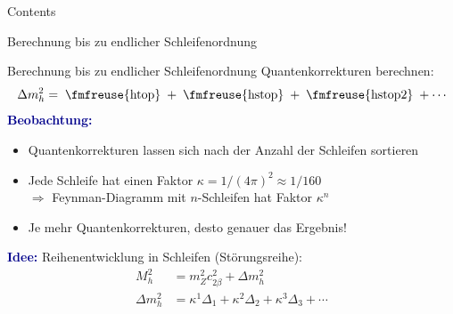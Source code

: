 \documentclass[hyperref={pdfpagelabels=false},ngerman]{beamer}
\newcommand{\fmfvcenter}[1]{\;\vcenter{\hbox{\fmfreuse{#1}}}\;}
\newcommand{\MS}{\ensuremath{M_S}}
\renewcommand{\emph}[1]{\textbf{\textcolor{darkblue}{#1}}}
\newcommand{\MSSM}{\ensuremath{\text{MSSM}}}
\begin{document}
\begin{frame}{Contents}
\end{frame}

\begin{frame}{Berechnung bis zu endlicher Schleifenordnung}
  \begin{center}
  \end{center}
\end{frame}

\begin{frame}{Berechnung bis zu endlicher Schleifenordnung}
  Quantenkorrekturen berechnen:
  \begin{align*}
    \Delta m_h^2 = \fmfvcenter{htop} + \fmfvcenter{hstop} + \fmfvcenter{hstop2} + \cdots
  \end{align*}
  \emph{Beobachtung:}
  \begin{itemize}
  \item Quantenkorrekturen lassen sich nach der Anzahl der Schleifen
    sortieren
  \item Jede Schleife hat einen Faktor $\kappa = 1/(4\pi)^2 \approx 1/160$\\
    $\Rightarrow$ Feynman-Diagramm mit $n$-Schleifen hat Faktor $\kappa^n$
  \item Je mehr Quantenkorrekturen, desto genauer das Ergebnis!
  \end{itemize}
  \vspace*{1em}
  \emph{Idee:}
  Reihenentwicklung in Schleifen (Störungsreihe):
  \begin{align*}
    M_h^2 &= m_Z^2 c_{2\beta}^2 + \Delta m_h^2 \\
    \Delta m_h^2 &= \kappa^1 \Delta_1 + \kappa^2 \Delta_2 + \kappa^3 \Delta_3 + \cdots
  \end{align*}
\end{frame}
\end{document}
